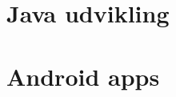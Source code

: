 

\newif\ifdraftmode
\draftmodefalse







	
	\graphicspath{{figures/}}
	
	
	
	
	

	\tableofcontents


	\part{Java udvikling}

	\ifdraftmode
		\graphicspath{{sections/manual/example/figures/}}
		
	\fi
	
	\graphicspath{{sections/java/1/figures/}}
	
	
	\graphicspath{{sections/java/2/figures/}}
	
	
	\part{Android apps}
	
	\graphicspath{{sections/android/studio/figures/}}
	
	
